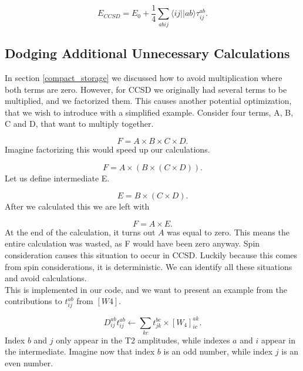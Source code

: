 \documentclass[a4paper,norsk,11pt,twoside]{report}
\begin{document}
\begin{equation}
E_{CCSD} = E_0 + \frac{1}{4} \sum_{abij} \langle ij || ab \rangle \tau_{ij}^{ab} .
\end{equation}

\subsection{Dodging Additional Unnecessary Calculations}
In section \ref{compact_storage} we discussed how to avoid multiplication where both terms are zero. However, for CCSD we originally had several terms to be multiplied, and we factorized them. This causes another potential optimization, that we wish to introduce with a simplified example. Consider four terms, A, B, C and D, that want to multiply together.

\begin{equation}
F = A \times B \times C \times D .
\end{equation}
Imagine factorizing this would speed up our calculations.

\begin{equation}
F = A \times (B \times (C \times D ) ) .
\end{equation}
Let us define intermediate E.

\begin{equation}
E = B \times (C \times D ) .
\end{equation}
After we calculated this we are left with

\begin{equation}
F = A \times E .
\end{equation}
At the end of the calculation, it turns out $A$ was equal to zero. This
means the entire calculation was wasted, as F would have been zero
anyway. Spin consideration causes this situation to occur in
CCSD. Luckily because this comes from spin considerations, it is
deterministic. We can identify all these situations and avoid
calculations. \\

This is implemented in our code, and we want to present an example from the contributions to $t_{ij}^{ab}$ from $[W4]$.

\begin{equation}
D_{ij}^{ab} t_{ij}^{ab} \leftarrow \sum_{kc} t_{jk}^{bc} \times [W_4]_{ic}^{ak} .
\end{equation}
Index $b$ and $j$ only appear in the T2 amplitudes, while indexes $a$ and $i$ appear in the intermediate. Imagine now that index $b$ is an odd number, while index $j$ is an even number. \\
\end{document}
